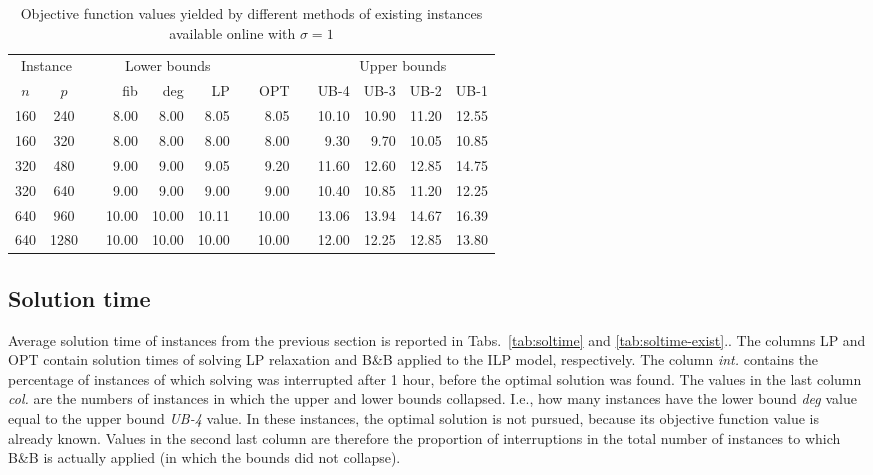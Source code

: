\begin{footnotesize}
\begin{table}[]
\centering
\begin{tabular}{ccrrrrrrrrrrr}
\multicolumn{2}{c}{Instance} & &\multicolumn{3}{c}{Lower bounds} & & & &\multicolumn{4}{c}{Upper bounds} \\
\cline{1-2}\cline{4-6}\cline{10-13}
$n$ & $p$  &   & fib  & deg  & LP  &  & OPT & & UB-4  & UB-3  & UB-2  & UB-1  \\
\hline
 160 & 240  && 8.00 & 8.00 & 8.05 && 8.05 &&10.10 &10.90  &11.20  & 12.55 \\
 160 & 320  && 8.00 & 8.00 & 8.00 && 8.00 && 9.30 & 9.70  &10.05  & 10.85 \\
 320 & 480  && 9.00 & 9.00 & 9.05 && 9.20 &&11.60 &12.60  &12.85  & 14.75 \\
 320 & 640  && 9.00 & 9.00 & 9.00 && 9.00 &&10.40 &10.85  &11.20  & 12.25 \\
 640 & 960  &&10.00 &10.00 &10.11 &&10.00 &&13.06 &13.94  &14.67  & 16.39 \\
 640 &1280  &&10.00 &10.00 &10.00 &&10.00 &&12.00 &12.25  &12.85  & 13.80 \\
\end{tabular}
\caption{Objective function values yielded by different methods of existing instances available online with $\sigma=1$}
\label{tab:obj-exist}
\end{table}
\end{footnotesize}
\subsection{Solution time}

Average solution time of instances from the previous section is reported in Tabs.~\ref{tab:soltime} and \ref{tab:soltime-exist}..
The columns LP and OPT contain solution times of solving LP relaxation and B\&B applied to the ILP model, respectively.
The column \emph{int.} contains the percentage of instances of which solving was interrupted after 1 hour, before the optimal solution was found.
The values in the last column \emph{col.} are the numbers of instances in which the upper and lower bounds collapsed. 
I.e., how many instances have the lower bound \emph{deg} value equal to the upper bound \emph{UB-4} value.
In these instances, the optimal solution is not pursued, because its objective function value is already known.
Values in the second last column are therefore the proportion of interruptions in the total number of instances to which B\&B is actually applied 
(in which the bounds did not collapse).

